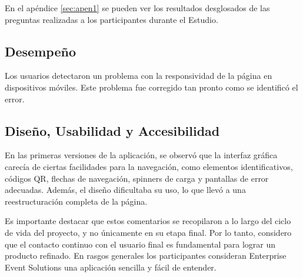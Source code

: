 En el apéndice \ref{sec:apen1} se pueden ver los resultados desglosados de las preguntas realizadas a los participantes durante el Estudio.
\subsection{Desempeño}

Los usuarios detectaron un problema con la responsividad de la página en dispositivos móviles. Este problema
fue corregido tan pronto como se identificó el error.

\subsection{Diseño, Usabilidad y Accesibilidad}
En las primeras versiones de la aplicación, se observó que la interfaz gráfica carecía de ciertas facilidades para la navegación, como elementos
identificativos, códigos QR, flechas de navegación, spinners de carga y pantallas de error adecuadas. Además, el diseño dificultaba su uso, lo que llevó a una reestructuración completa de la página.

Es importante destacar que estos comentarios se recopilaron a lo largo del ciclo de vida del proyecto, y no únicamente en su etapa final.
Por lo tanto, considero que el contacto continuo con el usuario final es fundamental para lograr un producto refinado. En rasgos generales los participantes consideran Enterprise Event Solutions una aplicación sencilla y fácil de entender.
